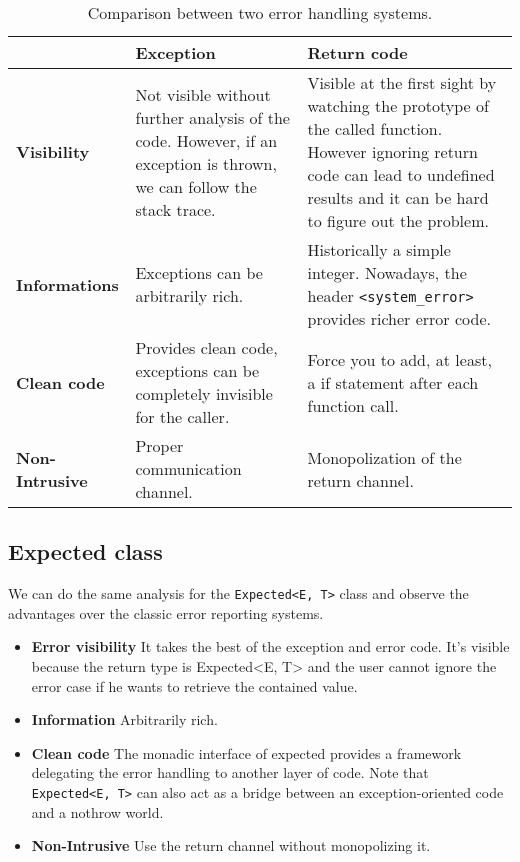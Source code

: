 \documentclass[a4paper,10pt]{article}
\newcommand{\cpp}[1]{\lstinline{#1}}
\begin{document}
\begin{table}[h!]
\centering
\bgroup
\def\arraystretch{1.5}
\begin{tabular}{|l|>{\raggedright\arraybackslash}p{5cm}|>{\raggedright\arraybackslash}p{5cm}|}
\hline
                    & \textbf{Exception} & \textbf{Return code} \\
\hline
\textbf{Visibility} & Not visible without further analysis of the code. However, if an exception is thrown, we can follow the stack trace. & Visible at the first sight by watching the prototype of the called function. However ignoring return code can lead to undefined results and it can be hard to figure out the problem. \\
\hline
\textbf{Informations} & Exceptions can be arbitrarily rich. & Historically a simple integer. Nowadays, the header \cpp{<system_error>} provides richer error code. \\
\hline
\textbf{Clean code} & Provides clean code, exceptions can be completely invisible for the caller. & Force you to add, at least, a if statement after each function call. \\
\hline
\textbf{Non-Intrusive} & Proper communication channel. & Monopolization of the return channel. \\
\hline
\end{tabular}
\egroup
\caption{Comparison between two error handling systems.}
\label{comp-handling-error}
\end{table}

\subsection{Expected class}

We can do the same analysis for the \cpp{Expected<E, T>} class and observe the advantages over the classic error reporting systems.

\begin{itemize}
 \item \textbf{Error visibility} It takes the best of the exception and error code. It's visible because the return type is Expected<E, T> and the user cannot ignore the error case if he wants to retrieve the contained value.
 \item \textbf{Information} Arbitrarily rich.
 \item \textbf{Clean code} The monadic interface of expected provides a framework delegating the error handling to another layer of code. Note that \cpp{Expected<E, T>} can also act as a bridge between an exception-oriented code and a nothrow world.
 \item \textbf{Non-Intrusive} Use the return channel without monopolizing it.
\end{itemize}
\end{document}
